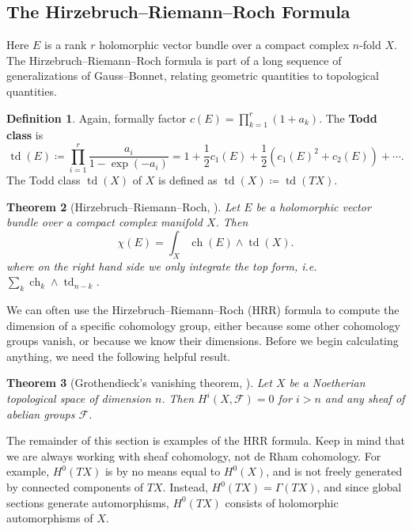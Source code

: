 \documentclass{report}
\theoremstyle{plain}
\newtheorem{theorem}{Theorem}[section]
\theoremstyle{definition}
\newtheorem{definition}[theorem]{Definition}
\theoremstyle{remark}
\newcommand{\cF}{\mathcal{F}}
\DeclareMathOperator{\ch}{ch}
\DeclareMathOperator{\td}{td}
\begin{document}
\subsection{The Hirzebruch--Riemann--Roch Formula}

Here $E$ is a rank $r$ holomorphic vector bundle over a compact
complex $n$-fold $X$. The Hirzebruch--Riemann--Roch formula is part of
a long sequence of generalizations of Gauss--Bonnet, relating
geometric quantities to topological quantities.

\begin{definition}
  Again, formally factor $c(E) = \prod_{k=1}^r (1 + a_k)$. The {\bf
    Todd class} is
  \[ \td(E) \coloneqq \prod_{i=1}^r \frac{a_i}{1 - \exp(-a_i)} = 1 + \frac{1}{2}c_1(E) + \frac{1}{2}(c_1(E)^2 + c_2(E)) + \cdots. \]
  The Todd class $\td(X)$ of $X$ is defined as $\td(X) \coloneqq
  \td(TX)$.
\end{definition}

\begin{theorem}[Hirzebruch--Riemann--Roch, {\cite[Theorem A.4.1]{Hartshorne1997}}]
  Let $E$ be a holomorphic vector bundle over a compact complex
  manifold $X$. Then
  \[ \chi(E) = \int_X \ch(E) \wedge \td(X). \]
  where on the right hand side we only integrate the top form, i.e.
  $\sum_k \ch_k \wedge \td_{n-k}$.
\end{theorem}

We can often use the Hirzebruch--Riemann--Roch (HRR) formula to
compute the dimension of a specific cohomology group, either because
some other cohomology groups vanish, or because we know their
dimensions. Before we begin calculating anything, we need the
following helpful result.

\begin{theorem}[Grothendieck's vanishing theorem, {\cite[Theorem 2.7]{Hartshorne1997}}]
  Let $X$ be a Noetherian topological space of dimension $n$. Then
  $H^i(X, \cF) = 0$ for $i > n$ and any sheaf of abelian groups $\cF$.
\end{theorem}

The remainder of this section is examples of the HRR formula. Keep in
mind that we are always working with sheaf cohomology, not de Rham
cohomology. For example, $H^0(TX)$ is by no means equal to $H^0(X)$,
and is not freely generated by connected components of $TX$. Instead,
$H^0(TX) = \Gamma(TX)$, and since global sections generate
automorphisms, $H^0(TX)$ consists of holomorphic automorphisms of $X$.
\end{document}
